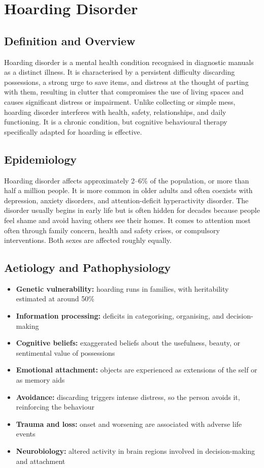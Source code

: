\chapter{Hoarding Disorder}

\section*{Definition and Overview}
Hoarding disorder is a mental health condition recognised in diagnostic manuals as a distinct illness. It is characterised by a persistent difficulty discarding possessions, a strong urge to save items, and distress at the thought of parting with them, resulting in clutter that compromises the use of living spaces and causes significant distress or impairment. Unlike collecting or simple mess, hoarding disorder interferes with health, safety, relationships, and daily functioning. It is a chronic condition, but cognitive behavioural therapy specifically adapted for hoarding is effective.

\section*{Epidemiology}
Hoarding disorder affects approximately 2--6\% of the population, or more than half a million people. It is more common in older adults and often coexists with depression, anxiety disorders, and attention-deficit hyperactivity disorder. The disorder usually begins in early life but is often hidden for decades because people feel shame and avoid having others see their homes. It comes to attention most often through family concern, health and safety crises, or compulsory interventions. Both sexes are affected roughly equally.

\section*{Aetiology and Pathophysiology}
\begin{itemize}
    \item \textbf{Genetic vulnerability:} hoarding runs in families, with heritability estimated at around 50\%
    \item \textbf{Information processing:} deficits in categorising, organising, and decision-making
    \item \textbf{Cognitive beliefs:} exaggerated beliefs about the usefulness, beauty, or sentimental value of possessions
    \item \textbf{Emotional attachment:} objects are experienced as extensions of the self or as memory aids
    \item \textbf{Avoidance:} discarding triggers intense distress, so the person avoids it, reinforcing the behaviour
    \item \textbf{Trauma and loss:} onset and worsening are associated with adverse life events
    \item \textbf{Neurobiology:} altered activity in brain regions involved in decision-making and attachment
\end{itemize}

